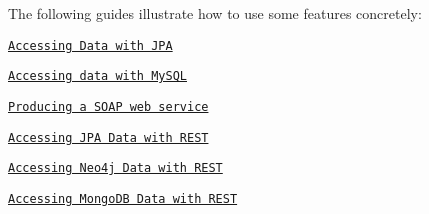 The following guides illustrate how to use some features concretely\+:


\begin{DoxyItemize}
\item \href{https://spring.io/guides/gs/accessing-data-jpa/}{\tt Accessing Data with J\+PA}
\item \href{https://spring.io/guides/gs/accessing-data-mysql/}{\tt Accessing data with My\+S\+QL}
\item \href{https://spring.io/guides/gs/producing-web-service/}{\tt Producing a S\+O\+AP web service}
\item \href{https://spring.io/guides/gs/accessing-data-rest/}{\tt Accessing J\+PA Data with R\+E\+ST}
\item \href{https://spring.io/guides/gs/accessing-neo4j-data-rest/}{\tt Accessing Neo4j Data with R\+E\+ST}
\item \href{https://spring.io/guides/gs/accessing-mongodb-data-rest/}{\tt Accessing Mongo\+DB Data with R\+E\+ST} 
\end{DoxyItemize}